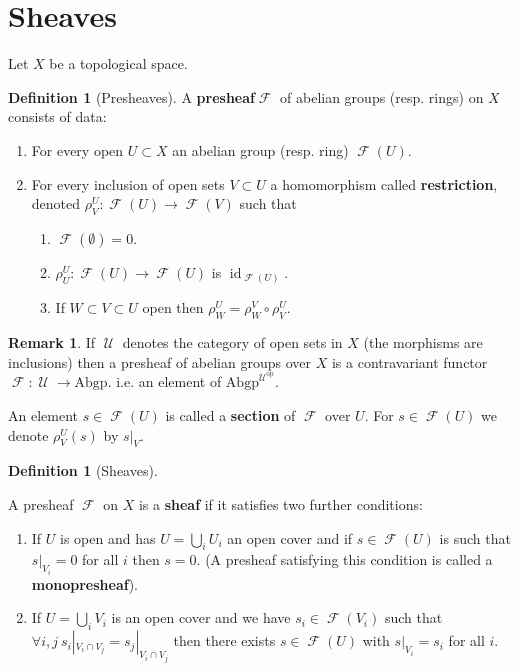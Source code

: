 \documentclass[10pt,]{book}
\newcommand{\terminology}[1]{\textbf{#1}}
\theoremstyle{plain}
\theoremstyle{definition}
\newtheorem{definition}[theorem]{Definition}
\newtheorem{remark}[theorem]{Remark}
\DeclareMathOperator{\id}{id}
\DeclareMathOperator{\F}{\mathcal{F}}
\DeclareMathOperator{\U}{\mathcal{U}}
\begin{document}
\section[Sheaves]{Sheaves}\label{sec-sheaves}
Let \(X\) be a topological space.%
\begin{definition}[Presheaves]\label{definition-1}
A \terminology{presheaf}\(\F\) of abelian groups (resp. rings) on \(X\) consists of data:
            \begin{enumerate}
\item{}For every open \(U \subset X\) an abelian group (resp. ring) \(\F(U)\).\item{}For every inclusion of open sets \(V\subset U\) a homomorphism called \terminology{restriction}, denoted \(\rho^U_V\colon \F(U) \to \F(V)\) such that
                \begin{enumerate}
\item{}\(\F(\emptyset) = 0.\)\item{}\(\rho^U_U\colon \F(U) \to \F(U)\) is \(\id_{\F(U)}\).\item{}If \(W \subset V \subset U\) open then \(\rho^U_W = \rho^V_W \circ \rho^U_V\).\end{enumerate}

              \end{enumerate}
\end{definition}
\begin{remark}\label{remark-1}
If \(\U\) denotes the category of open sets in \(X\) (the morphisms are inclusions) then a presheaf of abelian groups over \(X\) is a contravariant functor \(\F\colon  \U \to \text{Abgp}.\)
          i.e. an element of \(\text{Abgp}^{\U^\text{op}}\).
          \end{remark}
\par
An element \(s \in \F(U)\) is called a \terminology{section} of \(\F\) over \(U\).
          For \(s\in \F(U)\) we denote \(\rho^U_V(s)\) by \(s|_V\).
\begin{definition}[Sheaves]\label{definition-2}

            A presheaf \(\F\) on \(X\) is a \terminology{sheaf} if it satisfies two further conditions:
            \begin{enumerate}
\item{}If \(U\) is open and has \(U = \bigcup_i U_i\) an open cover and if \(s \in \F(U)\) is such that \(s|_{V_i} = 0\) for all \(i\) then \(s = 0\).
                (A presheaf satisfying this condition is called a \terminology{monopresheaf}).
              \item{}If \(U = \bigcup_i V_i\) is an open cover and we have \(s_i\in \F(V_i)\) such that \(\forall i,j\ s_i|_{V_i\cap V_j} = s_j|_{V_i\cap V_j}\) then there exists \(s \in \F(U)\) with \(s|_{V_i} = s_i\) for all \(i\).\end{enumerate}
\end{definition}
\end{document}
